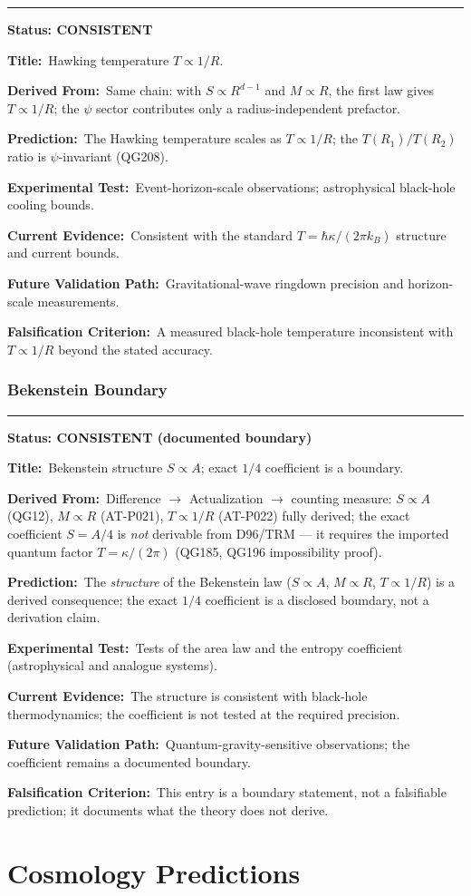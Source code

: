 \documentclass[11pt,a4paper]{article}
\newcommand{\predstart}[2]{%
  \par\medskip\noindent\hrule\par\smallskip
  \noindent{\large\bfseries #1}\hfill{\bfseries Status: #2}\par\smallskip
}
\newcommand{\pfield}[2]{%
  \noindent\textbf{#1:}~#2\par\smallskip
}
\begin{document}
\predstart{AT-P022}{CONSISTENT}
\pfield{Title}{Hawking temperature $T \propto 1/R$.}
\pfield{Derived From}{Same chain: with $S \propto R^{d-1}$ and $M \propto R$, the first law
gives $T \propto 1/R$; the $\psi$ sector contributes only a radius-independent prefactor.}
\pfield{Prediction}{The Hawking temperature scales as $T \propto 1/R$; the $T(R_1)/T(R_2)$
ratio is $\psi$-invariant (QG208).}
\pfield{Experimental Test}{Event-horizon-scale observations; astrophysical black-hole
cooling bounds.}
\pfield{Current Evidence}{Consistent with the standard $T = \hbar\kappa/(2\pi k_B)$
structure and current bounds.}
\pfield{Future Validation Path}{Gravitational-wave ringdown precision and horizon-scale
measurements.}
\pfield{Falsification Criterion}{A measured black-hole temperature inconsistent with
$T \propto 1/R$ beyond the stated accuracy.}

\section{Bekenstein Boundary}
\label{sec:bekenstein}

\predstart{AT-P023}{CONSISTENT (documented boundary)}
\pfield{Title}{Bekenstein structure $S \propto A$; exact $1/4$ coefficient is a boundary.}
\pfield{Derived From}{Difference $\to$ Actualization $\to$ counting measure: $S \propto A$
(QG12), $M \propto R$ (AT-P021), $T \propto 1/R$ (AT-P022) fully derived; the exact
coefficient $S = A/4$ is \emph{not} derivable from D96/TRM --- it requires the imported
quantum factor $T = \kappa/(2\pi)$ (QG185, QG196 impossibility proof).}
\pfield{Prediction}{The \emph{structure} of the Bekenstein law ($S \propto A$, $M \propto R$,
$T \propto 1/R$) is a derived consequence; the exact $1/4$ coefficient is a disclosed
boundary, not a derivation claim.}
\pfield{Experimental Test}{Tests of the area law and the entropy coefficient (astrophysical
and analogue systems).}
\pfield{Current Evidence}{The structure is consistent with black-hole thermodynamics; the
coefficient is not tested at the required precision.}
\pfield{Future Validation Path}{Quantum-gravity-sensitive observations; the coefficient
remains a documented boundary.}
\pfield{Falsification Criterion}{This entry is a boundary statement, not a falsifiable
prediction; it documents what the theory does not derive.}

\part{Cosmology Predictions}
\end{document}
